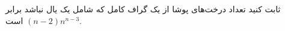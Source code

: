 \EXERCISE
ثابت کنید تعداد درخت‌های پوشا از یک گراف کامل که شامل یک یال نباشد برابر
$(n - 2)n^{n-3}$
است.